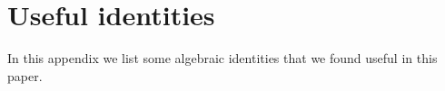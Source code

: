 \documentclass[11pt,a4paper]{article}
\begin{document}


  
 
 \section{Useful identities}
 In this appendix we list some algebraic identities that we found useful in this paper.
 
\end{document}
